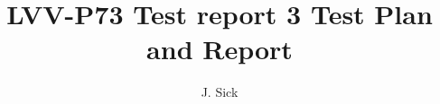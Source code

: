 \documentclass[DM,lsstdraft,toc]{lsstdoc}
\begin{document}
\def\milestoneName{Test report 3}
\def\milestoneId{LVV-P73}
\def\product{Data Management}


\title{LVV-P73 Test report 3 Test Plan and Report}
\setDocRef{\lsstDocType-\lsstDocNum}
\date{\vcsdate}
\author{J. Sick}



\end{document}
